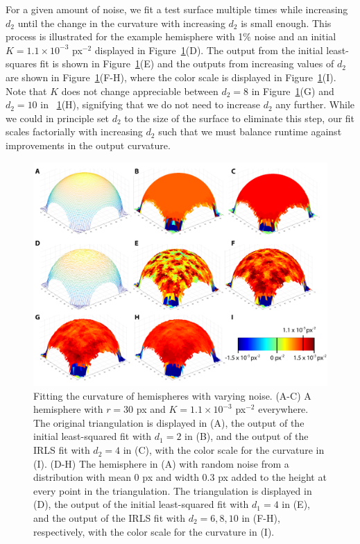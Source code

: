 For a given amount of noise, we fit a test surface multiple times while increasing $d_2$ until the change in the curvature with increasing $d_2$ is small enough.
This process is illustrated for the example hemisphere with 1\% noise and an initial $K =1.1 \times 10^{-3}$ px$^{-2}$ displayed in Figure~\ref{f:3-CurvFitSphere}(D).
The output from the initial least-squares fit is shown in Figure~\ref{f:3-CurvFitSphere}(E) and the outputs from increasing values of $d_2$ are shown in Figure~\ref{f:3-CurvFitSphere}(F-H), where the color scale is displayed in Figure~\ref{f:3-CurvFitSphere}(I).
Note that $K$ does not change appreciable between $d_2 = 8$ in Figure~\ref{f:3-CurvFitSphere}(G) and $d_2 = 10$ in ~\ref{f:3-CurvFitSphere}(H), signifying that we do not need to increase $d_2$ any further.
While we could in principle set $d_2$ to the size of the surface to eliminate this step, our fit scales factorially with increasing $d_2$ such that we must balance runtime against improvements in the output curvature.
\begin{figure}
  \centering
  \includegraphics{figures/C3/Ch3-Figs_CurvFitSphere.png}
  \caption{Fitting the curvature of hemispheres with varying noise.
  (A-C) A hemisphere with $r = 30$ px and $K = 1.1 \times 10^{-3}$ px$^{-2}$ everywhere.
  The original triangulation is displayed in (A), the output of the initial least-squared fit with $d_1=2$ in (B), and the output of the IRLS fit with $d_2=4$ in (C), with the color scale for the curvature in (I).
  (D-H) The hemisphere in (A) with random noise from a distribution with mean 0 px and width 0.3 px added to the height at every point in the triangulation.
  The triangulation is displayed in (D), the output of the initial least-squared fit with $d_1=4$ in (E), and the output of the IRLS fit with $d_2=6,8,10$ in (F-H), respectively, with the color scale for the curvature in (I).}\label{f:3-CurvFitSphere}
\end{figure}

